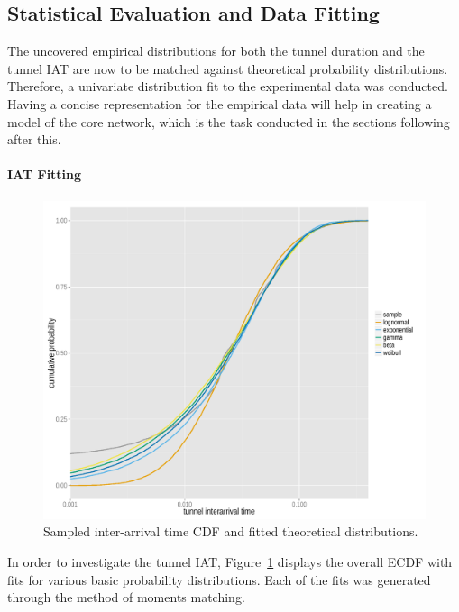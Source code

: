 \subsection{Statistical Evaluation and Data Fitting}
\label{c4:sec:statistical_evaluation}

The uncovered empirical distributions for both the tunnel duration and the tunnel \gls{IAT} are now to be matched against theoretical probability distributions. Therefore, a univariate distribution fit to the experimental data was conducted. Having a concise representation for the empirical data will help in creating a model of the core network, which is the task conducted in the sections following after this.


\paragraph{\gls{IAT} Fitting}

\begin{figure}[htb]
	\centering
	\includegraphics[width=1.0\textwidth]{images/R-IAT-ecdfs.pdf}
	\caption{Sampled inter-arrival time \gls{CDF} and fitted theoretical distributions.}
\label{c4:fig:IAT-cdfs}
\end{figure}

In order to investigate the tunnel \gls{IAT}, Figure~\ref{c4:fig:IAT-cdfs} displays the overall \gls{ECDF} with fits for various basic probability distributions. Each of the fits was generated through the method of moments matching.

